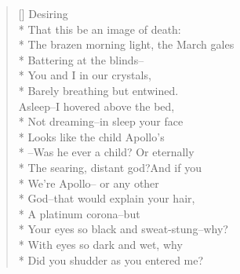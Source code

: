 \begin{verse}[\versewidth]
Desiring\\*
That this be an image of death:\\*
The brazen morning light, the March gales\\*
Battering at the blinds--\\*
You and I in our crystals,\\*
Barely breathing but entwined.\\
Asleep--I hovered above the bed,\\*
Not dreaming--in sleep your face\\*
Looks like the child Apollo's\\*
--Was he ever a child? Or eternally\\*
The searing, distant god?\quad And if you\\*
We're Apollo-- or any other\\*
God--that would explain your hair,\\*
A platinum corona--but\\*
Your eyes so black and sweat-stung--why?\\*
With eyes so dark and wet, why\\*
Did you shudder as you entered me?
\end{verse}
